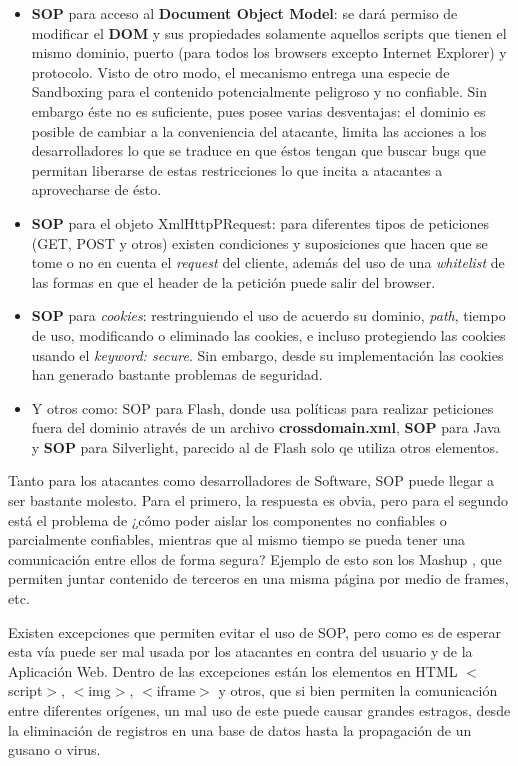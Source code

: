     \begin{itemize}
        \item \textbf{SOP} para acceso al \textbf{Document Object Model}: se dará permiso de modificar el \textbf{DOM} y sus propiedades solamente aquellos scripts que tienen el mismo dominio, puerto (para todos los browsers excepto Internet Explorer) y protocolo. Visto de otro modo, el mecanismo entrega una especie de Sandboxing para el contenido potencialmente peligroso y no confiable. Sin embargo éste no es suficiente, pues posee varias desventajas: el dominio es posible de cambiar a la conveniencia del atacante, limita las acciones a los desarrolladores lo que se traduce en que éstos tengan que buscar bugs que permitan liberarse de estas restricciones lo que incita a atacantes a aprovecharse de ésto.
        \item \textbf{SOP} para el objeto XmlHttpPRequest: para diferentes tipos de peticiones (GET, POST y otros) existen condiciones y suposiciones que hacen que se tome o no en cuenta el \textit{request} del cliente, además del uso de una \textit{whitelist} de las formas en que el header de la petición puede salir del browser.
        \item \textbf{SOP} para \textit{cookies}: restringuiendo el uso de acuerdo su dominio, \textit{path}, tiempo de uso, modificando o eliminado las cookies, e incluso protegiendo las cookies usando el \textit{keyword: secure}. Sin embargo, desde su implementación las cookies han generado bastante problemas de seguridad.
        \item Y otros como: {SOP} para Flash, donde usa políticas para realizar peticiones fuera del dominio através de un archivo \textbf{crossdomain.xml}, \textbf{SOP} para Java y \textbf{SOP} para Silverlight, parecido al de Flash solo qe utiliza otros elementos.
    \end{itemize}

        
   Tanto para los atacantes como desarrolladores de Software, SOP puede llegar a ser bastante molesto. Para el primero, la respuesta es obvia, pero para el segundo está el problema de ¿cómo poder aislar los componentes no confiables o parcialmente confiables, mientras que al mismo tiempo se pueda tener una comunicación entre ellos de forma segura? Ejemplo de esto son los Mashup \cite{barth2009securing}, que permiten juntar contenido de terceros en una misma página por medio de frames, etc. 
        
    Existen excepciones que permiten evitar el uso de SOP, pero como es de esperar esta vía puede ser mal usada por los atacantes en contra del usuario y de la Aplicación Web. Dentro de las excepciones están los elementos en HTML \(<\)script\(>\), \(<\)img\(>\), \(<\)iframe\(>\) y otros, que si bien permiten la comunicación entre diferentes orígenes, un mal uso de este puede causar grandes estragos, desde la eliminación de registros en una base de datos hasta la propagación de un gusano o virus.
        
